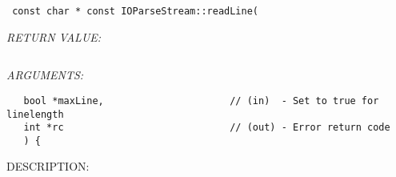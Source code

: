   
\begin{verbatim} const char * const IOParseStream::readLine(\end{verbatim}{\em RETURN VALUE:}
\begin{verbatim} \end{verbatim}{\em ARGUMENTS:}
\begin{verbatim}   bool *maxLine,                      // (in)  - Set to true for linelength
   int *rc                             // (out) - Error return code
   ) {\end{verbatim}
{\sf DESCRIPTION:\\ }


      
 
  
\setlength{\parskip}{\oldparskip}
\setlength{\parindent}{\oldparindent}
\setlength{\baselineskip}{\oldbaselineskip}
